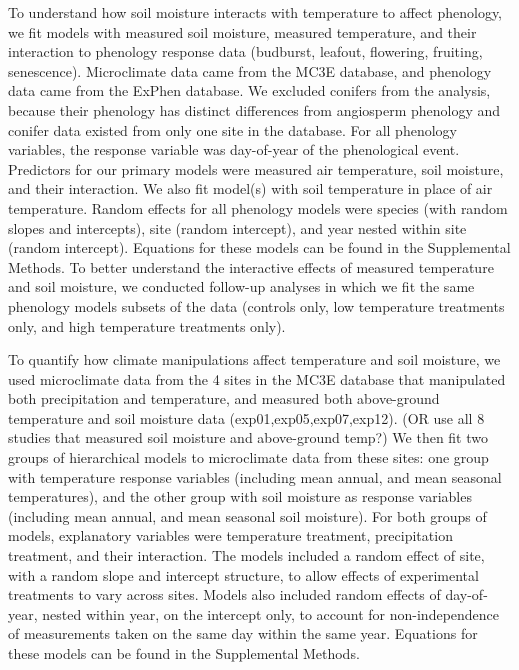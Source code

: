 \documentclass{article}
\begin{document}
\par To understand how soil moisture interacts with temperature to affect phenology, we fit models with measured soil moisture, measured temperature, and their interaction to phenology response data (budburst, leafout, flowering, fruiting, senescence). Microclimate data came from the MC3E database, and phenology data came from the ExPhen database. We excluded conifers from the analysis, because their phenology has distinct differences from angiosperm phenology \cite{polgar2014} and conifer data existed from only one site in the database. For all phenology variables, the response variable was day-of-year of the phenological event. Predictors for our primary models were measured air temperature, soil moisture, and their interaction. We also fit model(s) with soil temperature in place of air temperature. Random effects for all phenology models were species (with random slopes and intercepts), site (random intercept), and year nested within site (random intercept). Equations for these models can be found in the Supplemental Methods. 
To better understand the interactive effects of measured temperature and soil moisture, we conducted follow-up analyses in which we fit the same phenology models subsets of the data (controls only, low temperature treatments only, and high temperature treatments only).
\par To quantify how climate manipulations affect temperature and soil moisture, we used microclimate data from the 4 sites in the MC3E database that manipulated both precipitation and temperature, and measured both above-ground temperature and soil moisture data (exp01,exp05,exp07,exp12). (OR use all 8 studies that measured soil moisture and above-ground temp?) We then fit two groups of hierarchical models to microclimate data from these sites: one group with temperature response variables (including mean annual, and mean seasonal temperatures), and the other group with soil moisture as response variables (including mean annual, and mean seasonal soil moisture). For both groups of models, explanatory variables were temperature treatment, precipitation treatment, and their interaction. The models included a random effect of site, with a random slope and intercept structure, to allow effects of experimental treatments to vary across sites. Models also included random effects of day-of-year, nested within year, on the intercept only, to account for non-independence of measurements taken on the same day within the same year. Equations for these models can be found in the Supplemental Methods. 

\end{document}
